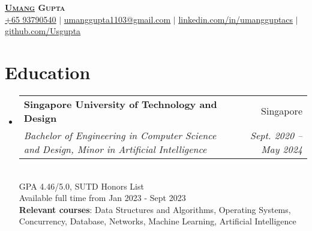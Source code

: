 \documentclass[letterpaper,11pt]{article}
\makeatletter
\newcommand{\resumeSubheading}[4]{
  \vspace{-2pt}\item
    \begin{tabular*}{0.97\textwidth}[t]{l@{\extracolsep{\fill}}r}
      \textbf{#1} & #2 \\
      \textit{\small#3} & \textit{\small #4} \\
    \end{tabular*}\vspace{-7pt}
}
\newcommand{\resumeSubHeadingListStart}{\begin{itemize}[leftmargin=0.15in, label={}]}
\newcommand{\resumeSubHeadingListEnd}{\end{itemize}}
\makeatother
\begin{document}


\begin{center}
    \textbf{\Huge \scshape \underline{Umang} Gupta} \\ \vspace{1pt}
    \small \href{tel:+6593790540}{ \underline {+65 93790540}}
  $|$ \href{mailto:umanggupta1103@gmail.com}{ \underline{umanggupta1103@gmail.com}} $|$ 
    \href{https://linkedin.com/in/umangguptacs}{ \underline{linkedin.com/in/umangguptacs}} $|$\href{https://github.com/Usgupta}{  \underline{github.com/Usgupta}}
\end{center}


\section{Education}
  \resumeSubHeadingListStart
    \resumeSubheading
      {Singapore University of Technology and Design}{Singapore}
      {Bachelor of Engineering in Computer Science and Design, Minor in Artificial Intelligence}{Sept. 2020 -- May 2024}
      \newline{}
    \\{{GPA 4.46/5.0, SUTD Honors List}}
    \\{Available full time from Jan 2023 - Sept 2023}
    \\\textbf{Relevant courses}{: Data Structures and Algorithms, Operating Systems, Concurrency, Database, Networks, Machine Learning, Artificial Intelligence}
  \resumeSubHeadingListEnd


\end{document}
